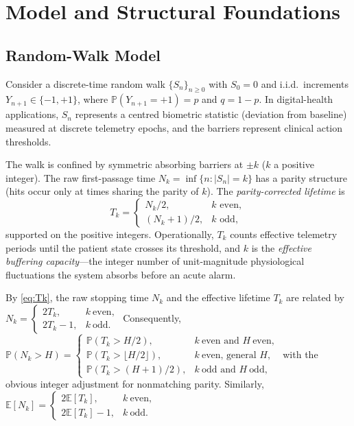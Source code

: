 \documentclass[pdflatex,sn-mathphys-num]{sn-jnl}
\theoremstyle{definition}
\newcommand{\Prob}{\mathbb{P}}
\newcommand{\E}{\mathbb{E}}
\numberwithin{equation}{section}
\begin{document}
\section{Model and Structural Foundations}\label{sec:model}

\subsection{Random-Walk Model}

Consider a discrete-time random walk $\{S_n\}_{n\ge 0}$ with $S_0=0$ and i.i.d.\ increments $Y_{n+1}\in\{-1,+1\}$, where $\Prob(Y_{n+1}=+1)=p$ and $q=1-p$. In digital-health applications, $S_n$ represents a centred biometric statistic (deviation from baseline) measured at discrete telemetry epochs, and the barriers represent clinical action thresholds.

The walk is confined by symmetric absorbing barriers at $\pm k$ ($k$ a positive integer). The raw first-passage time $N_k = \inf\{n: |S_n|=k\}$ has a parity structure (hits occur only at times sharing the parity of $k$). The \emph{parity-corrected lifetime} is
\begin{equation}\label{eq:Tk}
T_k = \begin{cases} N_k/2, & k \text{ even},\\ (N_k+1)/2, & k \text{ odd}, \end{cases}
\end{equation}
supported on the positive integers. Operationally, $T_k$ counts effective telemetry periods until the patient state crosses its threshold, and $k$ is the \emph{effective buffering capacity}---the integer number of unit-magnitude physiological fluctuations the system absorbs before an acute alarm.

By \eqref{eq:Tk}, the raw stopping time \(N_k\) and the effective lifetime \(T_k\) are related by
$\displaystyle N_k=
\begin{cases}
2T_k, & k \ \text{even},\\
2T_k-1, & k \ \text{odd}.
\end{cases}$
Consequently,
$\displaystyle \Prob(N_k>H)
=
\begin{cases}
\Prob(T_k>H/2), & k \ \text{even and } H \ \text{even},\\
\Prob(T_k>\lfloor H/2\rfloor), & k \ \text{even, general }H,\\
\Prob(T_k>(H+1)/2), & k \ \text{odd and } H \ \text{odd},
\end{cases}$
with the obvious integer adjustment for nonmatching parity.
Similarly,
$\displaystyle \E[N_k]=
\begin{cases}
2\E[T_k], & k \ \text{even},\\
2\E[T_k]-1, & k \ \text{odd}.
\end{cases}$
\end{document}
